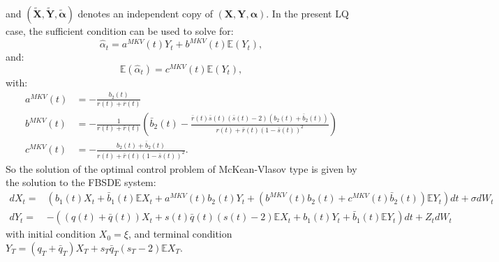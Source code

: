 \documentclass[11pt]{article}
\begin{document}
and $(\boldsymbol{\tilde{X}},\boldsymbol{\tilde{Y}},\boldsymbol{\tilde{\alpha}})$ denotes an independent copy of $(\boldsymbol{X},\boldsymbol{Y},\boldsymbol{\alpha})$. In the present LQ case, the sufficient condition can be used to solve for:
\begin{equation*}
    \hat{\alpha}_t=a^{MKV}(t)Y_t+b^{MKV}(t)\mathbb{E}(Y_t),
\end{equation*}
and:
\begin{equation*}
    \mathbb{E}(\hat{\alpha}_t)=c^{MKV}(t)\mathbb{E}(Y_t),
\end{equation*}
with:
\begin{equation*}
\begin{split}
    a^{MKV}(t)&=-\frac{b_2(t)}{r(t)+\bar{r}(t)} \\
    b^{MKV}(t)&=-\frac{1}{r(t)+\bar{r}(t)}\left(\bar{b}_2(t)-\frac{\bar{r}(t)\bar{s}(t)(\bar{s}(t)-2)(b_2(t)+\bar{b}_2(t))}{r(t)+\bar{r}(t)(1-\bar{s}(t))^2} \right) \\
    c^{MKV}(t)&=-\frac{b_2(t)+\bar{b}_2(t)}{r(t)+\bar{r}(t)(1-\bar{s}(t))^2}.
\end{split}
\end{equation*}
So the solution of the optimal control problem of McKean-Vlasov type is given by the solution to the FBSDE system:
\begin{equation}
\begin{split}
        dX_t=&\left(b_1(t)X_t+\bar{b}_1(t) \mathbb{E}X_t+a^{MKV}(t)b_2(t)Y_t+(b^{MKV}(t)b_2(t)+c^{MKV}(t)\bar{b}_2(t))\mathbb{E}Y_t\right)dt+\sigma dW_t \\
        dY_t=&-\left((q(t)+\bar{q}(t))X_t+s(t)\bar{q}(t)(s(t)-2)\mathbb{E}X_t+b_1(t)Y_t+\bar{b}_1(t)\mathbb{E}Y_t\right)dt +Z_t dW_t
\end{split}
\label{eq:FBSDE_EMKV}
\end{equation}
with initial condition $X_0=\xi$, and terminal condition $Y_T=(q_T+\bar{q}_T)X_T+s_T\bar{q}_T(s_T-2)\mathbb{E}X_T$.
\end{document}
